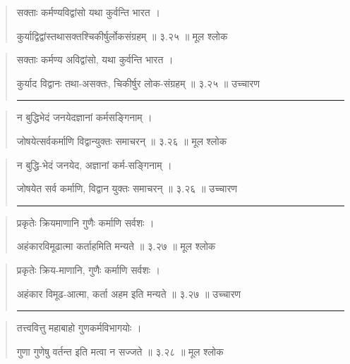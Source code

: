 \begin{quotation}

सक्ताः कर्मण्यविद्वांसो यथा कुर्वन्ति भारत  ।  

कुर्याद्विद्वांस्तथासक्तश्चिकीर्षुर्लोकसंग्रहम्‌  ॥ ३.२५ ॥  मूल श्लोक
\end{quotation}

\begin{quotation}

सक्ताः कर्मण्य अविद्वांसो, यथा कुर्वन्ति भारत  ।  

कुर्याद विद्वानः तथा-असक्तः, चिकीर्षुर लोक-संग्रहम्‌  ॥ ३.२५ ॥  उच्चारण

\noindent\rule{16cm}{0.4pt} 
\end{quotation}


\begin{quotation}

न बुद्धिभेदं जनयेदज्ञानां कर्मसङि्गनाम्‌  ।  

जोषयेत्सर्वकर्माणि विद्वान्युक्तः समाचरन्‌  ॥ ३.२६ ॥  मूल श्लोक
\end{quotation}

\begin{quotation}

न बुद्धि-भेदं जनयेद, अज्ञानां कर्म-सङि्गनाम्‌  ।  

जोषयेत सर्व कर्माणि, विद्वान युक्तः समाचरन्‌  ॥ ३.२६ ॥  उच्चारण

\noindent\rule{16cm}{0.4pt} 
\end{quotation}


\begin{quotation}

प्रकृतेः क्रियमाणानि गुणैः कर्माणि सर्वशः  ।  

अहंकारविमूढात्मा कर्ताहमिति मन्यते  ॥ ३.२७ ॥  मूल श्लोक
\end{quotation}

\begin{quotation}

प्रकृतेः क्रिय-माणानि, गुणैः कर्माणि सर्वशः  ।  

अहंकार विमूढ-आत्मा, कर्ता अहम इति मन्यते  ॥ ३.२७ ॥  उच्चारण

\noindent\rule{16cm}{0.4pt} 
\end{quotation}


\begin{quotation}

तत्त्ववित्तु महाबाहो गुणकर्मविभागयोः  ।  

गुणा गुणेषु वर्तन्त इति मत्वा न सज्जते  ॥ ३.२८ ॥  मूल श्लोक
\end{quotation}

